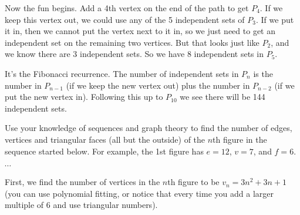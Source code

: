 \documentclass[10pt]{exam}
\def\vertexsize{4 pt}
\newcommand{\vtx}[2]{node[fill,circle,inner sep=0 pt, minimum size=\vertexsize,label=#1:#2]{}}
\renewcommand{\v}{\vtx{above}{}}
\begin{document}
\begin{questions}
\begin{solution}
Now the fun begins.  Add a 4th vertex on the end of the path to get $P_4$.  If we keep this vertex out, we could use any of the 5 independent sets of $P_3$.  If we put it in, then we cannot put the vertex next to it in, so we just need to get an independent set on the remaining two vertices.  But that looks just like $P_2$, and we know there are 3 independent sets.  So we have $8$ independent sets in $P_5$.

It's the Fibonacci recurrence.  The number of independent sets in $P_n$ is the number in $P_{n-1}$ (if we keep the new vertex out) plus the number in $P_{n-2}$ (if we put the new vertex in).  Following this up to $P_{10}$ we see there will be 144 independent sets.
\end{solution}



\question[5] Use your knowledge of sequences and graph theory to find the number of edges, vertices and triangular faces (all but the outside) of the $n$th figure in the sequence started below.  For example, the 1st figure has $e = 12$, $v = 7$, and $f = 6$.

\hfill
{}
\hfill
{}
\hfill
$\cdots$

\begin{solution}
  First, we find the number of vertices in the $n$th figure to be $v_n = 3n^2 +3n + 1$ (you can use polynomial fitting, or notice that every time you add a larger multiple of 6 and use triangular numbers).


\end{solution}
\end{questions}
\end{document}
